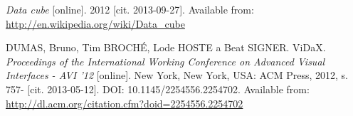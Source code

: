 \begin{thebibliography}{99}
\emph{Data cube} [online]. 2012 [cit. 2013-09-27]. 
Available from: \url{http://en.wikipedia.org/wiki/Data_cube}

{\sc DUMAS,} Bruno, Tim BROCHÉ, Lode HOSTE a Beat SIGNER. ViDaX.
\emph{Proceedings of the International Working Conference on Advanced Visual Interfaces - AVI '12}
[online]. New York, New York, USA: ACM Press, 2012, s. 757-
[cit. 2013-05-12]. DOI: 10.1145/2254556.2254702.
Available from: \url{http://dl.acm.org/citation.cfm?doid=2254556.2254702}



\end{thebibliography}
